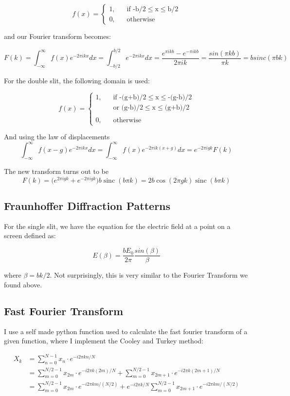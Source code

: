 \documentclass{article}
\begin{document}
\[
f(x) =
  \begin{cases}
    \text{1,} &\quad\text{if -b/2}\le\text{x}\le\text{b/2} \\
    \text{0,} &\quad\text{otherwise}
  \end{cases}
\]

and our Fourier transform becomes:

$$F(k) = \int_{-\infty}^{\infty}f(x)e^{-2\pi ikx}dx = \int_{-b/2}^{b/2}e^{- 2\pi ikx}dx = \frac{e^{\pi ikb}-e^{-\pi ikb}}{2\pi ik} = \frac{sin(\pi kb)}{\pi k} = bsinc(\pi bk) $$


For the double slit, the following domain is used:

\[
f(x) =
  \begin{cases}
    \text{1,} &\quad\text{if -(g+b)/2}\le\text{x}\le\text{-(g-b)/2} \\
     &\quad\text{or (g-b)/2}\le\text{x}\le\text{(g+b)/2} \\ \\
    \text{0,} &\quad\text{otherwise}
  \end{cases}
\]

And using the law of displacements
$$ \int_{-\infty}^{\infty} f(x-g)e^{-2\pi ikx}dx = \int_{-\infty}^{\infty} f(x)e^{-2\pi ik(x+g)} dx = e^{-2\pi ig k} F(k) $$

The new transform turns out to be
$$ F(k) = \big( e^{2\pi i gk} + e^{-2\pi i gk}\big)b\operatorname{sinc}(b\pi k) = 2b\cos(2\pi gk)\operatorname{sinc}(b\pi k) $$

\subsection{Fraunhoffer Diffraction Patterns}
For the single slit, we have the equation for the electric field at a point on a screen defined as:

$$E(\beta) = \frac{bE_0}{2\pi}\frac{sin(\beta)}{\beta}  $$

where $\beta = bk/2$. Not surprisingly, this is very similar to the Fourier Transform we found above.


\subsection{Fast Fourier Transform}
I use a self made python function used to calculate the fast fourier transform of a given function, where I implement the Cooley and Turkey method:

\begin{align}
X_k &= \sum_{n=0}^{N-1} x_n \cdot e^{-i 2\pi k n / N} \\
    &= \sum_{m=0}^{N/2-1}x_{2m} \cdot e^{-i 2\pi k (2m) / N} +\sum_{m=0}^{N/2-1}x_{2m+1} \cdot e^{-i 2\pi k (2m+1) / N} \\
    &= \sum_{m=0}^{N/2-1}x_{2m} \cdot e^{-i 2\pi k m / (N/2)} + e^{-i 2\pi k / N} \sum_{m=0}^{N/2-1}x_{2m+1} \cdot e^{-i 2\pi k m / (N/2)}
\end{align}
\end{document}
